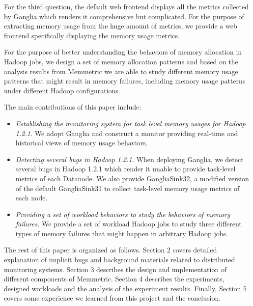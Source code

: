 For the third question, the default web frontend displays all the metrics collected by Ganglia which renders it comprehensive but complicated. For the purpose of extracting memory usage from the huge amount of metrics, we provide a web frontend specifically displaying the memory usage metrics.
\par
For the purpose of better understanding the behaviors of memory allocation in Hadoop jobs, we design a set of memory allocation patterns and based on the analysis results from Memmetric we are able to study different memory usage patterns that might result in memory failures, including memory usage patterns under different Hadoop configurations.
\par
The main contributions of this paper include:
\begin{itemize}
	\setlength{\itemsep}{1pt}
	 \setlength{\parskip}{0pt}
	 \setlength{\parsep}{0pt}
	\item
		\emph{ Establishing the monitoring system for task level memory usages for Hadoop 1.2.1.} We adopt Ganglia and construct a monitor providing real-time and historical views of memory usage behaviors.
	\item
		\emph{ Detecting several bugs in Hadoop 1.2.1.} When deploying Ganglia, we detect several bugs in Hadoop 1.2.1 which render it unable to provide task-level metrics of each Datanode. We also provide GangliaSink32, a modified version of the default GangliaSink31 to collect task-level memory usage metrics of each node.
	\item
		\emph{ Providing a set of workload behaviors to study the behaviors of memory failures.} We provide a set of workload Hadoop jobs to study three different types of memory failures that might happen in arbitrary Hadoop jobs.
\end{itemize}

The rest of this paper is organized as follows. Section 2 covers detailed explanation of implicit bugs and background materials related to distributed monitoring systems. Section 3 describes the design and implementation of different components of Memmetric. Section 4 describes the experiments, designed workloads and the analysis of the experiment results. Finally, Section 5 covers some experience we learned from this project and the conclusion.


